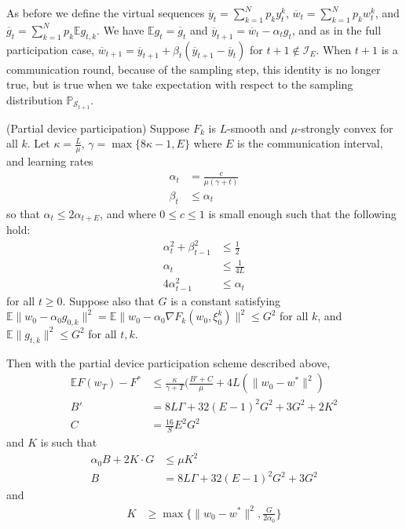As before we define the virtual sequences $\overline{y}_{t}=\sum_{k=1}^{N}p_{k}y_{t}^{k}$,
$\overline{w}_{t}=\sum_{k=1}^{N}p_{k}w_{t}^{k}$, and $\overline{g}_{t}=\sum_{k=1}^{N}p_{k}\mathbb{E}g_{t,k}$.
We have $\mathbb{E}g_{t}=\overline{g}_{t}$ and $\overline{y}_{t+1}=\overline{w}_{t}-\alpha_{t}g_{t}$,
and as in the full participation case, $\overline{w}_{t+1}=\overline{y}_{t+1}+\beta_{t}(\overline{y}_{t+1}-\overline{y}_{t})$
for $t+1\notin\mathcal{I}_{E}$. When $t+1$ is a communication round,
because of the sampling step, this identity is no longer true, but
is true when we take expectation with respect to the sampling distribution
$\mathbb{P}_{\mathcal{S}_{t+1}}$. 
\begin{theorem}
	(Partial device participation) Suppose $F_{k}$ is $L$-smooth and
	$\mu$-strongly convex for all $k$. Let $\kappa=\frac{L}{\mu}$,
	$\gamma=\max\{8\kappa-1,E\}$ where $E$ is the communication interval,
	and learning rates 
	\begin{align*}
	\alpha_{t} & =\frac{c}{\mu(\gamma+t)}\\
	\beta_{t} & \leq\alpha_{t}
	\end{align*}
	so that $\alpha_{t}\leq2\alpha_{t+E}$, and where $0\leq c\leq1$
	is small enough such that the following hold: 
	\begin{align*}
	\alpha_{t}^{2}+\beta_{t-1}^{2} & \leq\frac{1}{2}\\
	\alpha_{t} & \leq\frac{1}{4L}\\
	4\alpha_{t-1}^{2} & \leq\alpha_{t}
	\end{align*}
	for all $t\geq0$. Suppose also that $G$ is a constant satisfying
	$\mathbb{E}\|w_{0}-\alpha_{0}g_{0,k}\|^{2}=\mathbb{E}\|w_{0}-\alpha_{0}\nabla F_{k}(w_{0},\xi_{0}^{k})\|^{2}\leq G^{2}$
	for all $k$, and $\mathbb{E}\|g_{t,k}\|^{2}\leq G^{2}$ for all $t,k$. 
	
	Then with the partial device participation scheme described above,
	\begin{align*}
	\mathbb{E}F(w_{T})-F^{\ast} & \leq\frac{\kappa}{\gamma+T}(\frac{B'+C}{\mu}+4L(\|w_{0}-w^{\ast}\|^{2})\\
	B' & =8L\Gamma+32(E-1)^{2}G^{2}+3G^{2}+2K^{2}\\
	C & =\frac{16}{S}E^{2}G^{2}
	\end{align*}
	and $K$ is such that 
	\begin{align*}
	\alpha_{0}B+2K\cdot G & \leq\mu K^{2}\\
	B & =8L\Gamma+32(E-1)^{2}G^{2}+3G^{2}
	\end{align*}
	and
	\begin{align*}
	K & \geq\max\{\|w_{0}-w^{\ast}\|^{2},\frac{G}{2\alpha_{0}}\}
	\end{align*}
\end{theorem}
